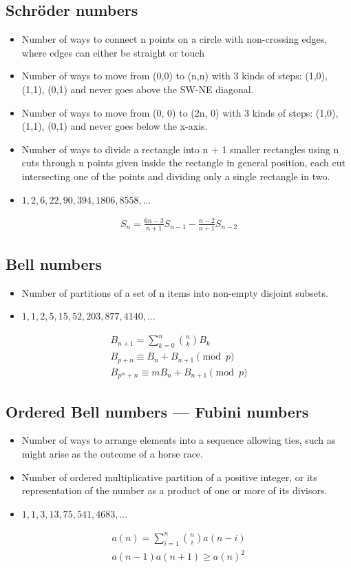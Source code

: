 \subsection{Schröder numbers}
\begin{itemize}
    \item Number of ways to connect n points on a circle with non-crossing edges, where edges can either be straight or touch
    \item Number of ways to move from (0,0) to (n,n) with 3 kinds of steps: (1,0), (1,1), (0,1) and never goes above the SW-NE diagonal.
    \item Number of ways to move from (0, 0) to (2n, 0) with 3 kinds of steps: (1,0), (1,1), (0,1) and never goes below the x-axis.
    \item Number of ways to divide a rectangle into n + 1 smaller rectangles using n cuts through n points given inside the rectangle in general position, each cut intersecting one of the points and dividing only a single rectangle in two.
    \item $1, 2, 6, 22, 90, 394, 1806, 8558, ...$
\end{itemize}
\begin{align*}
    S_n = \frac{6n - 3}{n + 1} S_{n-1} - \frac{n - 2}{n + 1} S_{n-2}
\end{align*}

\subsection{Bell numbers}
\begin{itemize}
\item Number of partitions of a set of n items into non-empty disjoint subsets.
\item $1, 1, 2, 5, 15, 52, 203, 877, 4140, ...$
\end{itemize}
\begin{align*}
    B_{n+1} = \sum_{k=0}^{n} \binom{n}{k} B_k\\
    B_{p+n} \equiv B_n + B_{n+1} \pmod{p}\\
    B_{p^m+n} \equiv mB_n + B_{n+1} \pmod{p}
\end{align*}

\subsection{Ordered Bell numbers --- Fubini numbers}
\begin{itemize}
\item Number of ways to arrange elements into a sequence allowing ties, such as might arise as the outcome of a horse race.
\item Number of ordered multiplicative partition of a positive integer, or its representation of the number as a product of one or more of its divisors.
\item $1, 1, 3, 13, 75, 541, 4683, ...$
\end{itemize}
\begin{align*}
    a(n) = \sum_{i=1}^{n} \binom{n}{i} a(n-i)\\
    a(n-1) a(n+1) \geq a(n)^2
\end{align*}

